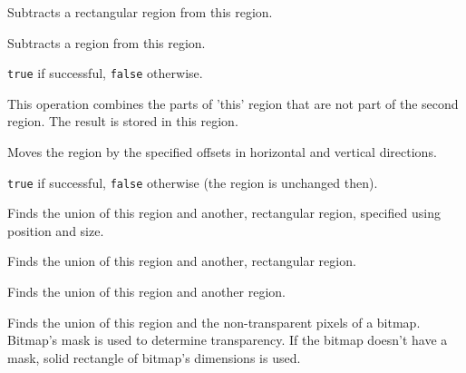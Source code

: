 
Subtracts a rectangular region from this region.


Subtracts a region from this region.


{\tt true} if successful, {\tt false} otherwise.


This operation combines the parts of 'this' region that are not part of the second region.
The result is stored in this region.


\label{wxregionoffset}



Moves the region by the specified offsets in horizontal and vertical
directions.


{\tt true} if successful, {\tt false} otherwise (the region is unchanged then).


\label{wxregionunion}


Finds the union of this region and another, rectangular region, specified using position and size.


Finds the union of this region and another, rectangular region.


Finds the union of this region and another region.


Finds the union of this region and the non-transparent pixels of a
bitmap. Bitmap's mask is used to determine transparency. If the bitmap doesn't
have a mask, solid rectangle of bitmap's dimensions is used.


